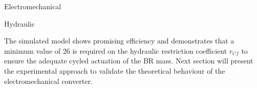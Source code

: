 \documentclass[3p,twocolumn,preprint]{elsarticle}
\def \hfillx {\hspace*{ -\linewidth} \hfill} %
\begin{document}
\begin{table}
\begin{subtable}[b]{.42\linewidth}
	\centering
	\caption{Electromechanical}
	\label{tab:parametres électromécaniques}			
\end{subtable}
\hfillx
\begin{subtable}[b]{.55\linewidth}
	\centering
	\caption{Hydraulic}
	\label{tab:parametres_hydrauliques}		
\end{subtable}
\caption{Simulated model theoretical parameters}
\end{table}

The simulated model shows promising efficiency and demonstrates that a minimum value of 26 is required on the hydraulic restriction coefficient $r_{Cf}$ to ensure the adequate cycled actuation of the BR mass. Next section will present the experimental approach to validate the theoretical behaviour of the electromechanical converter.
\end{document}
